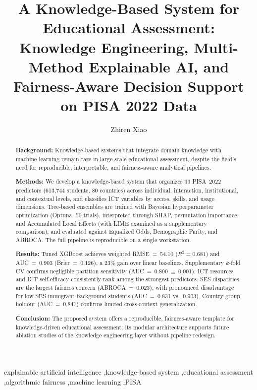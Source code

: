\documentclass[review,12pt]{elsarticle}
\begin{document}
\begin{frontmatter}

\title{A Knowledge-Based System for Educational Assessment: Knowledge Engineering, Multi-Method Explainable AI, and Fairness-Aware Decision Support on PISA 2022 Data}

\author[aff1]{Zhiren Xiao}

\address[aff1]{Guangdong University of Finance, Guangzhou, China}

\begin{abstract}
\setlength{\rightskip}{0pt plus 20pt}

\textbf{Background:} Knowledge-based systems that integrate domain knowledge with machine learning remain rare in large-scale educational assessment, despite the field's need for reproducible, interpretable, and fairness-aware analytical pipelines.

\textbf{Methods:} We develop a knowledge-based system that organizes 33 PISA~2022 predictors (613,744 students, 80 countries) across individual, interaction, institutional, and contextual levels, and classifies ICT variables by access, skills, and usage dimensions. Tree-based ensembles are trained with Bayesian hyperparameter optimization (Optuna, 50 trials), interpreted through SHAP, permutation importance, and Accumulated Local Effects (with LIME examined as a supplementary comparison), and evaluated against Equalized Odds, Demographic Parity, and ABROCA. The full pipeline is reproducible on a single workstation.

\textbf{Results:} Tuned XGBoost achieves weighted RMSE~=~54.10 ($R^2 = 0.681$) and AUC~=~0.903 (Brier~=~0.126), a 23\% gain over linear baselines. Supplementary $k$-fold CV confirms negligible partition sensitivity (AUC~=~0.890~$\pm$~0.001). ICT resources and ICT self-efficacy consistently rank among the strongest predictors. SES disparities are the largest fairness concern (ABROCA~=~0.023), with pronounced disadvantage for low-SES immigrant-background students (AUC~=~0.831 vs.\ 0.903). Country-group holdout (AUC~=~0.847) confirms limited cross-context generalization.

\textbf{Conclusion:} The proposed system offers a reproducible, fairness-aware template for knowledge-driven educational assessment; its modular architecture supports future ablation studies of the knowledge engineering layer without pipeline redesign.

\end{abstract}

\begin{keyword}
explainable artificial intelligence \sep knowledge-based system \sep educational assessment \sep algorithmic fairness \sep machine learning \sep PISA
\end{keyword}

\end{frontmatter}
\end{document}
